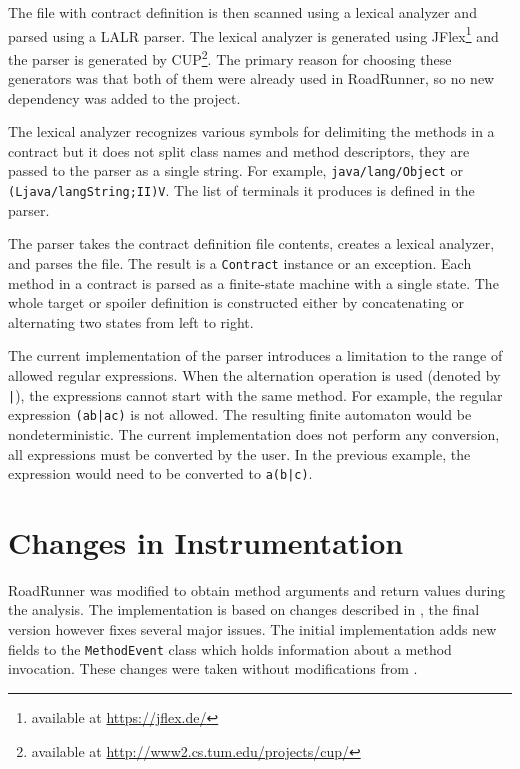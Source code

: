 The file with contract definition is then scanned using a lexical analyzer and
parsed using a LALR parser. The lexical analyzer is generated using
JFlex\footnote{available at \url{https://jflex.de/}} and the parser is generated
by CUP\footnote{available at \url{http://www2.cs.tum.edu/projects/cup/}}. The
primary reason for choosing these generators was that both of them were already
used in RoadRunner, so no new dependency was added to the project.

The lexical analyzer recognizes various symbols for delimiting the methods in a
contract but it does not split class names and method descriptors, they are
passed to the parser as a single string. For example, \texttt{java/lang/Object}
or \texttt{(Ljava/langString;II)V}. The list of terminals it produces is defined
in the parser.

The parser takes the contract definition file contents, creates a lexical
analyzer, and parses the file. The result is a \texttt{Contract} instance or an
exception. Each method in a contract is parsed as a finite-state machine with a
single state. The whole target or spoiler definition is constructed either by
concatenating or alternating two states from left to right.

The current implementation of the parser introduces a limitation to the range of
allowed regular expressions. When the alternation operation is used (denoted by
\texttt{|}), the expressions cannot start with the same method. For example, the
regular expression \texttt{(ab|ac)} is not allowed. The resulting finite
automaton would be nondeterministic. The current implementation does not perform
any conversion, all expressions must be converted by the user. In the previous
example, the expression would need to be converted to \texttt{a(b|c)}.

\section{Changes in Instrumentation}
\label{instrImpl}
RoadRunner was modified to obtain method arguments and return values during the
analysis. The implementation is based on changes described in \cite{janousek},
the final version however fixes several major issues. The initial implementation
adds new fields to the \texttt{MethodEvent} class which holds information about
a method invocation. These changes were taken without modifications from
\cite{janousek}.

